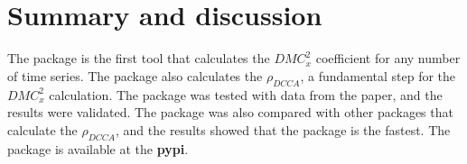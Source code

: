 \documentclass[article]{jss}
\begin{document}
\section{Summary and discussion} \label{sec:summary}

The  package is the first tool that calculates the $DMC_{x}^{2}$ coefficient for any number of time series. The package also calculates the $\rho_{DCCA}$, a fundamental step for the $DMC_{x}^{2}$ calculation. The package was tested with data from the \cite{RIBEIRO2025107419} paper, and the results were validated. The package was also compared with other packages that calculate the $\rho_{DCCA}$, and the results showed that the  package is the fastest. The package is available at the \textbf{pypi}.








\end{document}
